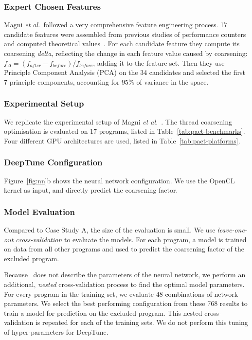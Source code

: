 

\subsubsection{Expert Chosen Features} Magni \emph{et al.\ }followed a very comprehensive feature engineering process. 17 candidate features were assembled from previous studies of performance counters and computed theoretical values~\cite{Magni2,Sim2012}. For each candidate feature they compute its coarsening \emph{delta}, reflecting the change in each feature value caused by coarsening: $f_{\Delta} = (f_{after} - f_{before}) / f_{before}$, adding it to the feature set. Then they use Principle Component Analysis (PCA) on the 34 candidates and selected the first 7 principle components, accounting for 95\% of variance in the space.

\subsubsection{Experimental Setup} We replicate the experimental setup of Magni \emph{et al.}~\cite{Magni2014}. The thread coarsening optimisation is evaluated on 17 programs, listed in Table~\ref{tab:pact-benchmarks}. Four different GPU architectures are used, listed in Table~\ref{tab:pact-platforms}.

\subsubsection{DeepTune Configuration} Figure~\ref{fig:nn}b shows the neural network configuration. We use the OpenCL kernel as input, and directly predict the coarsening factor.

\subsubsection{Model Evaluation} Compared to Case Study A, the size of the evaluation is small. We use \emph{leave-one-out cross-validation} to evaluate the models. For each program, a model is trained on data from all other programs and used to predict the coarsening factor of the excluded program.

Because~\cite{Magni2014} does not describe the parameters of the neural network, we perform an additional, \emph{nested} cross-validation process to find the optimal model parameters. For every program in the training set, we evaluate 48 combinations of network parameters. We select the best performing configuration from these 768 results to train a model for prediction on the excluded program. This nested cross-validation is repeated for each of the training sets. We do not perform this tuning of hyper-parameters for DeepTune.


